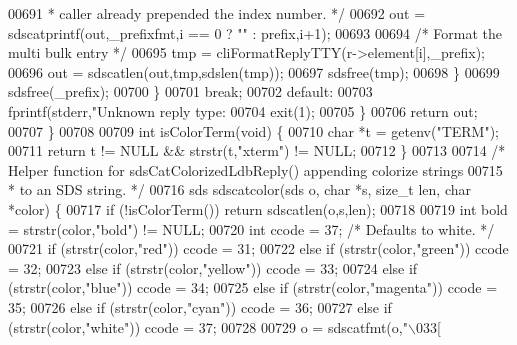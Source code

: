 \begin{DoxyCode}
{{{{{{{{{{{{{{{{{{{{00691 \textcolor{comment}{                 * caller already prepended the index number. */}
00692                 out = sdscatprintf(out,\_prefixfmt,i == 0 ? \textcolor{stringliteral}{""} : prefix,i+1);
00693 
00694                 \textcolor{comment}{/* Format the multi bulk entry */}
00695                 tmp = cliFormatReplyTTY(r->element[i],\_prefix);
00696                 out = sdscatlen(out,tmp,sdslen(tmp));
00697                 sdsfree(tmp);
00698             \}
00699             sdsfree(\_prefix);
00700         \}
00701     \textcolor{keywordflow}{break};
00702     \textcolor{keywordflow}{default}:
00703         fprintf(stderr,\textcolor{stringliteral}{"Unknown reply type: %
00704         exit(1);
00705     \}
00706     \textcolor{keywordflow}{return} out;
00707 \}
00708 
00709 \textcolor{keywordtype}{int} isColorTerm(\textcolor{keywordtype}{void}) \{
00710     \textcolor{keywordtype}{char} *t = getenv(\textcolor{stringliteral}{"TERM"});
00711     \textcolor{keywordflow}{return} t != NULL && strstr(t,\textcolor{stringliteral}{"xterm"}) != NULL;
00712 \}
00713 
00714 \textcolor{comment}{/* Helper  function for sdsCatColorizedLdbReply() appending colorize strings}
00715 \textcolor{comment}{ * to an SDS string. */}
00716 sds sdscatcolor(sds o, \textcolor{keywordtype}{char} *s, size\_t len, \textcolor{keywordtype}{char} *color) \{
00717     \textcolor{keywordflow}{if} (!isColorTerm()) \textcolor{keywordflow}{return} sdscatlen(o,s,len);
00718 
00719     \textcolor{keywordtype}{int} bold = strstr(color,\textcolor{stringliteral}{"bold"}) != NULL;
00720     \textcolor{keywordtype}{int} ccode = 37; \textcolor{comment}{/* Defaults to white. */}
00721     \textcolor{keywordflow}{if} (strstr(color,\textcolor{stringliteral}{"red"})) ccode = 31;
00722     \textcolor{keywordflow}{else} \textcolor{keywordflow}{if} (strstr(color,\textcolor{stringliteral}{"green"})) ccode = 32;
00723     \textcolor{keywordflow}{else} \textcolor{keywordflow}{if} (strstr(color,\textcolor{stringliteral}{"yellow"})) ccode = 33;
00724     \textcolor{keywordflow}{else} \textcolor{keywordflow}{if} (strstr(color,\textcolor{stringliteral}{"blue"})) ccode = 34;
00725     \textcolor{keywordflow}{else} \textcolor{keywordflow}{if} (strstr(color,\textcolor{stringliteral}{"magenta"})) ccode = 35;
00726     \textcolor{keywordflow}{else} \textcolor{keywordflow}{if} (strstr(color,\textcolor{stringliteral}{"cyan"})) ccode = 36;
00727     \textcolor{keywordflow}{else} \textcolor{keywordflow}{if} (strstr(color,\textcolor{stringliteral}{"white"})) ccode = 37;
00728 
00729     o = sdscatfmt(o,\textcolor{stringliteral}{"\(\backslash\)033[%
}}}}}}}}}}}}}}}}}}}}}}
\end{DoxyCode}
